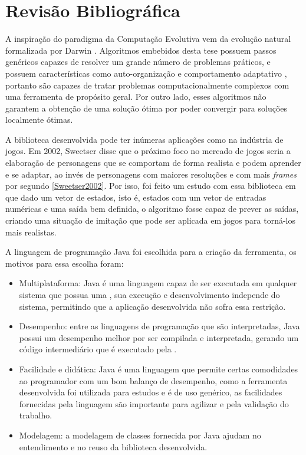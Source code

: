 \section{Revisão Bibliográfica} \label{secao:rev_bib}

A inspiração do paradigma da Computação Evolutiva vem da evolução natural formalizada por Darwin \cite{Ridley1996}. Algoritmos embebidos desta tese possuem passos genéricos capazes de resolver um grande número de problemas práticos, e possuem características como auto-organização e comportamento adaptativo \cite{Goldberg1988}, portanto são capazes de tratar problemas computacionalmente complexos com uma ferramenta de propósito geral. Por outro lado, esses algoritmos não garantem a obtenção de uma solução ótima \cite{Zuben2000} por poder convergir para soluções localmente ótimas.

A biblioteca desenvolvida pode ter inúmeras aplicações como na indústria de jogos. Em 2002, Sweetser disse que o próximo foco no mercado de jogos seria a elaboração de personagens que se comportam de forma realista e podem aprender e se adaptar, ao invés de personagens com maiores resoluções e com mais \textit{frames} por segundo \ref{Sweetser2002}. Por isso, foi feito um estudo com essa biblioteca em que dado um vetor de estados, isto é, estados com um vetor de entradas numéricas e uma saída bem definida, o algoritmo fosse capaz de prever as saídas, criando uma situação de imitação que pode ser aplicada em jogos para torná-los mais realistas.

A linguagem de programação Java foi escolhida para a criação da ferramenta, os motivos para essa escolha foram:

\newcommand{\JVM}{\sigla{JVM}{Java Virtual Machine}\xspace}

\begin{itemize}
    \item Multiplataforma: Java é uma linguagem capaz de ser executada em qualquer sistema que possua uma \JVM, sua execução e desenvolvimento independe do sistema, permitindo que a aplicação desenvolvida não sofra essa restrição.
    \item Desempenho: entre as linguagens de programação que são interpretadas, Java possui um desempenho melhor por ser compilada e interpretada, gerando um código intermediário que é executado pela \JVM.
    \item Facilidade e didática: Java é uma linguagem que permite certas comodidades ao programador com um bom balanço de desempenho, como a ferramenta desenvolvida foi utilizada para estudos e é de uso genérico, as facilidades fornecidas pela linguagem são importante para agilizar e pela validação do trabalho.
    \item Modelagem: a modelagem de classes fornecida por Java ajudam no entendimento e no reuso da biblioteca desenvolvida.
\end{itemize}

